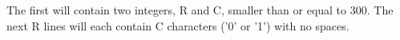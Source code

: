 The first will contain two integers, R and C, smaller than or equal to 300. The next R lines will each contain C characters ('0' or '1') with no spaces.